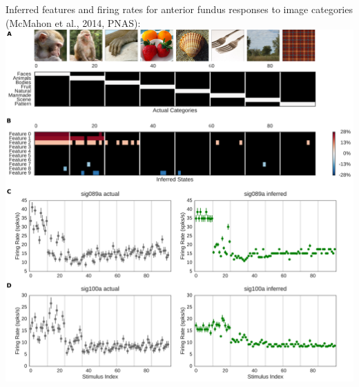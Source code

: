 \documentclass[12pt]{article}
\begin{document}
\noindent Inferred features and firing rates for anterior fundus responses to image categories (McMahon et al., 2014, PNAS): \\

\includegraphics[width=\linewidth]{../plos2016/figures/imgclust}
\end{document}
